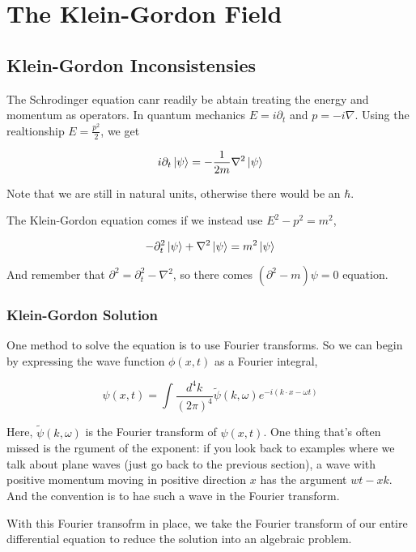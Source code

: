 
\section{The Klein-Gordon Field}

\subsection{Klein-Gordon Inconsistensies}

The Schrodinger equation canr readily be abtain treating the energy and momentum as operators.
In quantum mechanics $E = i\partial_t$ and $p = -i\nabla$.
Using the realtionship $E = \frac{p^2}{2}$, we get


$$
i\partial_t \ket{\psi} = -\frac{1}{2m} \nabla^2 \ket{\psi}
$$

Note that we are still in natural units, otherwise there would be an $\hbar$.

The Klein-Gordon equation comes if we instead use $E^2 - p^2 = m^2$,

$$
-\partial_{t}^2 \ket{\psi} + \nabla^2 \ket{\psi} = m^2 \ket{\psi}
$$

And remember that $\partial^2 = \partial_{t}^{2} - \nabla^2$, so there comes $(\partial^2 - m)\psi = 0$ equation.



\subsubsection{Klein-Gordon Solution}

One method to solve the equation is to use Fourier transforms.
So we can begin by expressing the wave function $\phi(x,t)$ as a Fourier integral,

$$
\psi(x, t) =
\int \frac{d^4k}{\left(2\pi\right)^4} \tilde{\psi}(k, \omega) e^{-i(k\cdot x - \omega t)}
$$

Here, $\tilde{\psi}(k, \omega)$ is the Fourier transform of $\psi(x, t)$.
One thing that's often missed is the rgument of the exponent: if you look back to examples where we talk about plane waves
(just go back to the previous section), a wave with positive momentum moving in positive direction $x$ has the argument $wt - xk$.
And the convention is to hae such a wave in the Fourier transform.

With this Fourier transofrm in place, we take the Fourier transform of our entire differential equation to reduce
the solution into an algebraic problem.

